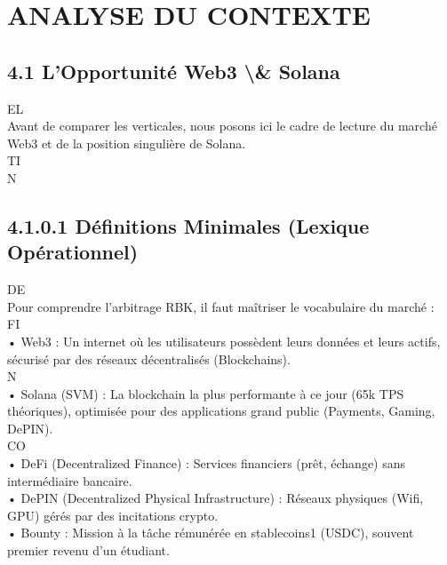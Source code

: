 \section{ANALYSE DU CONTEXTE}
\vspace{0.5em}
\vspace{0.5em}
\subsection{4.1 L’Opportunité Web3 \textbackslash{}& Solana}
\vspace{0.5em}
\vspace{0.5em}
\vspace{0.5em}
\vspace{0.5em}
EL\\
Avant de comparer les verticales, nous posons ici le cadre de lecture du marché Web3 et de la position singulière de Solana.\\
\vspace{0.5em}
\vspace{0.5em}
\vspace{0.5em}
\vspace{0.5em}
TI\\
N\\
\subsection{4.1.0.1 Définitions Minimales (Lexique Opérationnel)}
\vspace{0.5em}
\vspace{0.5em}
\vspace{0.5em}
\vspace{0.5em}
DE\\
Pour comprendre l’arbitrage RBK, il faut maîtriser le vocabulaire du marché :\\
\vspace{0.5em}
\vspace{0.5em}
\vspace{0.5em}
\vspace{0.5em}
FI\\
• Web3 : Un internet où les utilisateurs possèdent leurs données et leurs actifs, sécurisé par des réseaux décentralisés (Blockchains).\\
\vspace{0.5em}
\vspace{0.5em}
\vspace{0.5em}
\vspace{0.5em}
N\\
• Solana (SVM) : La blockchain la plus performante à ce jour (65k TPS théoriques), optimisée pour des applications grand public (Payments, Gaming, DePIN).\\
CO\\
• DeFi (Decentralized Finance) : Services financiers (prêt, échange) sans intermédiaire bancaire.\\
• DePIN (Decentralized Physical Infrastructure) : Réseaux physiques (Wifi, GPU) gérés par des incitations crypto.\\
• Bounty : Mission à la tâche rémunérée en stablecoins1 (USDC), souvent premier revenu d’un étudiant.\\
\vspace{0.5em}
\vspace{0.5em}
